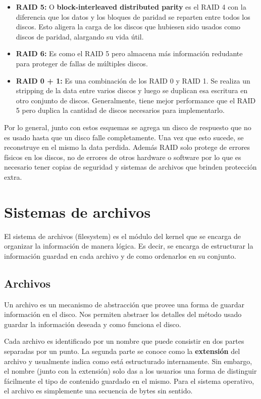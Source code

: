 \begin{itemize}
	\item \textbf{RAID 5:} O \textbf{block-interleaved distributed parity} es el RAID 4 con la diferencia que los datos y los bloques de paridad se reparten entre todos los discos. Esto aligera la carga de los discos que hubiesen sido usados como discos de paridad, alargando su vida útil.
	
	\item \textbf{RAID 6:} Es como el RAID 5 pero almacena más información redudante para proteger de fallas de múltiples discos.
	
	\item \textbf{RAID 0 + 1:} Es una combinación de los RAID 0 y RAID 1. Se realiza un stripping de la data entre varios discos y luego se duplican esa escritura en otro conjunto de discos. Generalmente, tiene mejor performance que el RAID 5 pero duplica la cantidad de discos necesarios para implementarlo.
\end{itemize}

Por lo general, junto con estos esquemas se agrega un disco de respuesto que no es usado hasta que un disco falle completamente. Una vez que esto sucede, se reconstruye en el mismo la data perdida. Además RAID solo protege de errores físicos en los discos, no de errores  de otros hardware o software por lo que es necesario tener copias de seguridad y sistemas de archivos que brinden protección extra.

\printbibliography[keyword=discos, title=Bibliografía]

\newpage
\section{Sistemas de archivos}
El sistema de archivos (filesystem) es el módulo del kernel que se encarga de organizar la información de manera lógica. Es decir, se encarga de estructurar la información guardad en cada archivo y de como ordenarlos en su conjunto.

\subsection{Archivos}
Un archivo es un mecanismo de abstracción que provee una forma de guardar información en el disco. Nos permiten abstraer los detalles del método usado guardar la información deseada y como funciona el disco.

Cada archivo es identificado por un nombre que puede consistir en dos partes separadas por un punto. La segunda parte se conoce como la \textbf{extensión} del archivo y usualmente indica como está estructurado internamente. Sin embargo, el nombre (junto con la extensión) solo das a los usuarios una forma de distinguir fácilmente el tipo de contenido guardado en el mismo. Para el sistema operativo, el archivo es simplemente una secuencia de bytes sin sentido.

